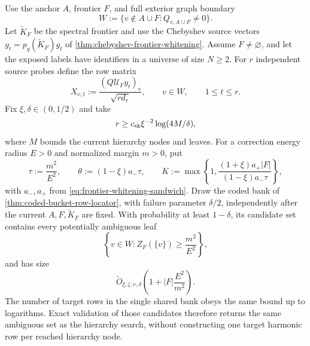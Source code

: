 \begin{corollary}
\label{cor:shared-coded-harmonic-bank}
Use the anchor $A$, frontier $F$, and full exterior graph boundary
\begin{equation*}
 W:=\{v\notin A\cup F:Q_{v,A\cup F}\neq0\}.
\end{equation*}
Let $\widetilde K_F$ be the spectral frontier and use the Chebyshev source vectors
$y_t=p_q(\widetilde K_F)g_t$ of
\cref{thm:chebyshev-frontier-whitening}.  Assume $F\neq\varnothing$, and let
the exposed labels have identifiers in a universe of size $N\geq2$.  For
$r$ independent source probes define the row matrix
\begin{equation}
 X_{v,t}:=\frac{(Q\mathcal U_Fy_t)_v}{\sqrt{r d_v}},
 \qquad v\in W,\qquad 1\leq t\leq r.
 \label{eq:coded-harmonic-row-matrix}
\end{equation}
Fix $\xi,\delta\in(0,1/2)$ and take
\begin{equation*}
 r\geq c_{\rm sk}\xi^{-2}\log(4M/\delta),
\end{equation*}
where $M$ bounds the current hierarchy nodes and leaves.  For a correction
energy radius $E>0$ and normalized margin $m>0$, put
\begin{equation}
 \tau:=\frac{m^2}{E^2},
 \qquad
 \theta:=(1-\xi)a_-\tau,
 \qquad
 K:=\max\!\left\{1,
  \frac{(1+\xi)a_+|F|}{(1-\xi)a_-\tau}
 \right\},
 \label{eq:coded-harmonic-budget}
\end{equation}
with $a_-,a_+$ from
\cref{eq:frontier-whitening-sandwich}.  Draw the coded bank of
\cref{thm:coded-bucket-row-locator}, with failure parameter $\delta/2$,
independently after the current
$A,F,\widetilde K_F$ are fixed.  With probability at least $1-\delta$, its
candidate set contains every potentially ambiguous leaf
\begin{equation}
 \left\{v\in W:Z_F(\{v\})\geq\frac{m^2}{E^2}\right\},
 \label{eq:coded-harmonic-ambiguous-set}
\end{equation}
and has size
\begin{equation}
 \widetilde O_{\xi,\zeta,\upsilon,\delta}\!\left(
  1+|F|\frac{E^2}{m^2}
 \right).
 \label{eq:coded-harmonic-candidate-count}
\end{equation}
The number of target rows in the single shared bank obeys the same bound up
to logarithms.  Exact validation of those candidates therefore returns the
same ambiguous set as the hierarchy search, without constructing one target
harmonic row per reached hierarchy node.


\end{corollary}
